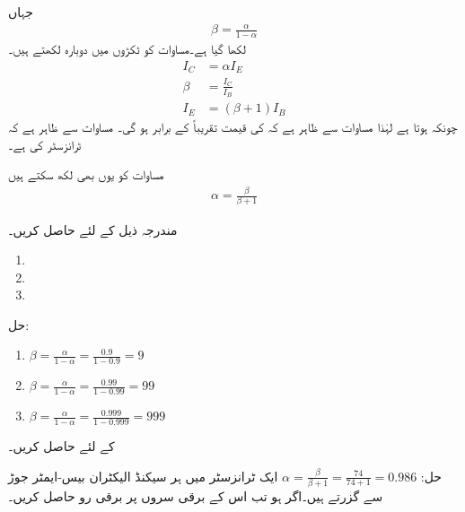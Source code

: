 جہاں
\begin{align} \label{مساوات_ٹرانزسٹر_افزائش_رو}
\beta = \frac{\alpha}{1-\alpha}
\end{align}
لکھا گیا ہے۔مساوات   کو ٹکڑوں میں دوبارہ لکھتے ہیں۔
\begin{align} 
I_C &=\alpha I_E  \label{مساوات_ٹرانزسٹر_کلکٹر _اور_مخارج_رو_برابر}\\
\beta&=\frac{I_C}{I_B} \label{مساوات_ٹرانزسٹر_افزائش}\\
I_E&=(\beta +1) I_B \label{مساوات_ٹرانزسٹر_مخارج_اور_قابو_رو}
\end{align}
چونکہ   ہوتا ہے لہٰذا مساوات   سے ظاہر ہے کہ   کی قیمت تقریباً   کے برابر ہو گی۔ مساوات   سے ظاہر ہے کہ  ٹرانزسٹر کی   ہے۔

	مساوات   کو یوں بھی لکھ سکتے ہیں
\begin{align} \label{مساوات_ٹرانزسٹر_بیٹا_سے_الفا} 
\alpha = \frac{\beta }{\beta +1}
\end{align}

 
مندرجہ ذیل کے لئے   حاصل کریں۔
\begin{enumerate}
\item
{}
\item
{}
\item
{}
\end{enumerate}
حل:
\begin{enumerate}
\item
$\beta = \frac{\alpha}{1-\alpha}=\frac{0.9}{1-0.9}=\num{9} $
\item
$\beta = \frac{\alpha}{1-\alpha}=\frac{0.99}{1-0.99}=\num{99} $
\item
$\beta = \frac{\alpha}{1-\alpha}=\frac{0.999}{1-0.999}=\num{999}$
\end{enumerate}


 کے لئے  حاصل کریں۔

حل:
$\alpha=\frac{\beta}{\beta+1} =\frac{74}{74+1}=\num{0.986}$
ایک ٹرانزسٹر میں ہر سیکنڈ   الیکٹران بیس-ایمٹر  جوڑ سے گزرتے ہیں۔اگر   ہو تب اس کے برقی سروں پر برقی رو حاصل کریں۔

